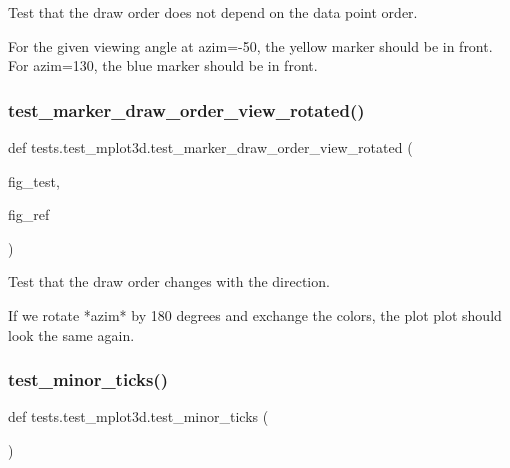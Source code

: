 \begin{DoxyVerb}Test that the draw order does not depend on the data point order.

For the given viewing angle at azim=-50, the yellow marker should be in
front. For azim=130, the blue marker should be in front.
\end{DoxyVerb}
 \mbox{\label{namespacetests_1_1test__mplot3d_a949c38e32b568257a430ce97d68f5ff8}} 
\subsubsection{\texorpdfstring{test\+\_\+marker\+\_\+draw\+\_\+order\+\_\+view\+\_\+rotated()}{test\_marker\_draw\_order\_view\_rotated()}}
{\footnotesize\ttfamily def tests.\+test\+\_\+mplot3d.\+test\+\_\+marker\+\_\+draw\+\_\+order\+\_\+view\+\_\+rotated (\begin{DoxyParamCaption}\item[{}]{fig\+\_\+test,  }\item[{}]{fig\+\_\+ref }\end{DoxyParamCaption})}

\begin{DoxyVerb}Test that the draw order changes with the direction.

If we rotate *azim* by 180 degrees and exchange the colors, the plot
plot should look the same again.
\end{DoxyVerb}
 \mbox{\label{namespacetests_1_1test__mplot3d_a0c9c61a599402c1d4db859f17ba2a43d}} 
\subsubsection{\texorpdfstring{test\+\_\+minor\+\_\+ticks()}{test\_minor\_ticks()}}
{\footnotesize\ttfamily def tests.\+test\+\_\+mplot3d.\+test\+\_\+minor\+\_\+ticks (\begin{DoxyParamCaption}{ }\end{DoxyParamCaption})}

